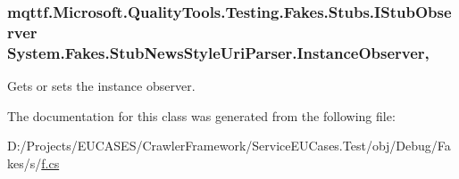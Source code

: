 \hypertarget{class_system_1_1_fakes_1_1_stub_news_style_uri_parser_adc1b419b65d439718c2b939d5ff5f00c}{
\subsubsection[{Instance\-Observer}]{\setlength{\rightskip}{0pt plus 5cm}mqttf.\-Microsoft.\-Quality\-Tools.\-Testing.\-Fakes.\-Stubs.\-I\-Stub\-Observer System.\-Fakes.\-Stub\-News\-Style\-Uri\-Parser.\-Instance\-Observer\hspace{0.3cm}{\ttfamily [get]}, {\ttfamily [set]}}}\label{class_system_1_1_fakes_1_1_stub_news_style_uri_parser_adc1b419b65d439718c2b939d5ff5f00c}


Gets or sets the instance observer.



The documentation for this class was generated from the following file\-:\begin{DoxyCompactItemize}
\item 
D\-:/\-Projects/\-E\-U\-C\-A\-S\-E\-S/\-Crawler\-Framework/\-Service\-E\-U\-Cases.\-Test/obj/\-Debug/\-Fakes/s/\hyperlink{s_2f_8cs}{f.\-cs}\end{DoxyCompactItemize}
